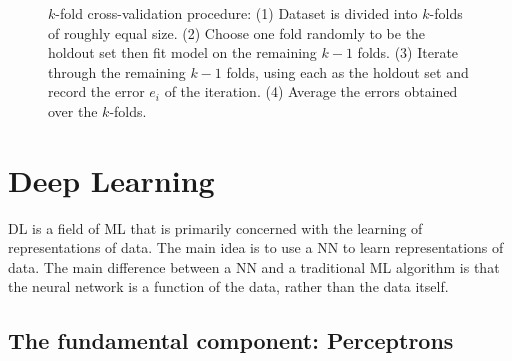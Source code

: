 \begin{figure}[htbp]
    \centering
    
    \captionsetup{format=hang} %
    \caption{
        $k$-fold cross-validation procedure: (1) Dataset is divided into
        $k$-folds of roughly equal size. (2) Choose one fold randomly to be the
        holdout set then fit model on the remaining $k-1$ folds. (3) Iterate
        through the remaining $k-1$ folds, using each as the holdout set and
        record the error $e_i$ of the iteration. (4) Average the errors obtained
        over the $k$-folds.
    }
    \label{fig:kfold-cv}
\end{figure}





\section{Deep Learning\label{sec:DL}}
\Gls{DL} is a field of \gls{ML} that is primarily concerned with
the learning of representations of data. The main idea is to use a \gls{NN} to learn representations of data. The main difference between a
\gls{NN} and a traditional \gls{ML} algorithm is that the
neural network is a function of the data, rather than the data itself.

\subsection{The fundamental component: Perceptrons}

